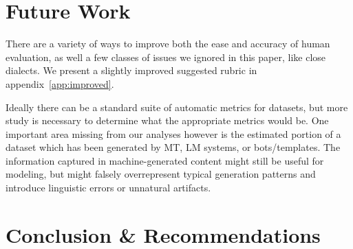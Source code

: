 \section{Future Work}
There are a variety of ways to improve both the ease and accuracy of human evaluation, as well a few classes of issues we ignored in this paper, like close dialects. We present a slightly improved suggested rubric in appendix~\ref{app:improved}.

Ideally there can be a standard suite of automatic metrics for datasets, but more study is necessary to determine what the appropriate metrics would be. One important area missing from our analyses however is the estimated portion of a dataset which has been generated by MT,  LM systems, or bots/templates. %
The information captured in machine-generated content might still be useful for modeling, but might falsely overrepresent typical generation patterns and introduce linguistic errors or unnatural artifacts.



\section{Conclusion \& Recommendations}\label{sec:recommendation}

